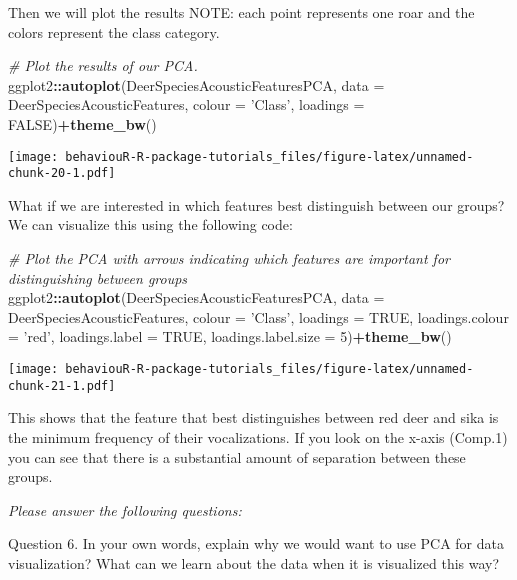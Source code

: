\documentclass[]{book}
\newenvironment{Shaded}{\begin{snugshade}}{\end{snugshade}}
\newcommand{\CommentTok}[1]{\textcolor[rgb]{0.56,0.35,0.01}{\textit{#1}}}
\newcommand{\DataTypeTok}[1]{\textcolor[rgb]{0.13,0.29,0.53}{#1}}
\newcommand{\DecValTok}[1]{\textcolor[rgb]{0.00,0.00,0.81}{#1}}
\newcommand{\KeywordTok}[1]{\textcolor[rgb]{0.13,0.29,0.53}{\textbf{#1}}}
\newcommand{\NormalTok}[1]{#1}
\newcommand{\OperatorTok}[1]{\textcolor[rgb]{0.81,0.36,0.00}{\textbf{#1}}}
\newcommand{\OtherTok}[1]{\textcolor[rgb]{0.56,0.35,0.01}{#1}}
\newcommand{\StringTok}[1]{\textcolor[rgb]{0.31,0.60,0.02}{#1}}
\begin{document}
Then we will plot the results
NOTE: each point represents one roar and the colors represent the class category.

\begin{Shaded}
\begin{Highlighting}[]
\CommentTok{# Plot the results of our PCA.}
\NormalTok{ggplot2}\OperatorTok{::}\KeywordTok{autoplot}\NormalTok{(DeerSpeciesAcousticFeaturesPCA, }\DataTypeTok{data =}\NormalTok{ DeerSpeciesAcousticFeatures, }\DataTypeTok{colour =} \StringTok{'Class'}\NormalTok{,}
         \DataTypeTok{loadings =} \OtherTok{FALSE}\NormalTok{)}\OperatorTok{+}\KeywordTok{theme_bw}\NormalTok{()}
\end{Highlighting}
\end{Shaded}

\texttt{[image: behaviouR-R-package-tutorials\_files/figure-latex/unnamed-chunk-20-1.pdf]}

What if we are interested in which features best distinguish between our groups?
We can visualize this using the following code:

\begin{Shaded}
\begin{Highlighting}[]
\CommentTok{# Plot the PCA with arrows indicating which features are important for distinguishing between groups}
\NormalTok{ggplot2}\OperatorTok{::}\KeywordTok{autoplot}\NormalTok{(DeerSpeciesAcousticFeaturesPCA, }\DataTypeTok{data =}\NormalTok{ DeerSpeciesAcousticFeatures, }\DataTypeTok{colour =} \StringTok{'Class'}\NormalTok{,}
         \DataTypeTok{loadings =} \OtherTok{TRUE}\NormalTok{, }\DataTypeTok{loadings.colour =} \StringTok{'red'}\NormalTok{,}
         \DataTypeTok{loadings.label =} \OtherTok{TRUE}\NormalTok{,}
         \DataTypeTok{loadings.label.size =} \DecValTok{5}\NormalTok{)}\OperatorTok{+}\KeywordTok{theme_bw}\NormalTok{()}
\end{Highlighting}
\end{Shaded}

\texttt{[image: behaviouR-R-package-tutorials\_files/figure-latex/unnamed-chunk-21-1.pdf]}

This shows that the feature that best distinguishes between red deer and sika is the minimum frequency of their vocalizations. If you look on the x-axis (Comp.1) you can see that there is a substantial amount of separation between these groups.

\emph{Please answer the following questions:}

Question 6. In your own words, explain why we would want to use PCA for data visualization? What can we learn about the data when it is visualized this way?
\end{document}
